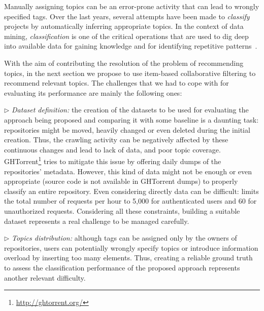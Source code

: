 Manually assigning topics can be an error-prone activity that can lead to 
wrongly specified tags. Over the last years, several attempts have been 
made to \textit{classify} \GH projects by automatically inferring 
appropriate topics. In the context of data mining, \textit{classification} is 
one of the critical operations that are used to dig deep into available data 
for gaining knowledge and for identifying repetitive 
patterns~\cite{kotsiantis2007supervised}. 



\smallskip

With the aim of contributing the resolution of the problem of recommending \GH 
topics, in the next section we propose to use item-based collaborative filtering to recommend relevant topics. The  
challenges that we had to cope with for evaluating its performance are mainly 
the following ones:

\vspace{.2cm}
\noindent
$\triangleright$ \emph{Dataset definition:} the creation of the datasets to be 
used for evaluating the approach being proposed and comparing it with some 
baseline is a daunting task: repositories might be moved, heavily changed or 
even deleted during the initial creation. Thus, the crawling activity can be 
negatively affected by these continuous changes and lead to lack of data, and 
poor topic coverage. GHTorrent\footnote{\url{http://ghtorrent.org/}} tries to 
mitigate this issue by offering daily dumps of the repositories' metadata. 
However, this kind of data might not be enough or even appropriate (\eg source 
code is not available in GHTorrent dumps) to properly classify  an entire 
repository.	Even considering directly \GH data can be difficult: \GH limits the 
total number of requests per hour to 5,000 for authenticated users and 60 for 
unauthorized requests. Considering all these constraints, building a suitable 
dataset represents a real challenge to be managed carefully.
	
\vspace{.2cm}
\noindent
$\triangleright$ \emph{Topics distribution:} although tags can be assigned only 
by the owners of \GH repositories, users can potentially wrongly specify topics 
or introduce information overload by inserting too many elements. Thus, 
creating a reliable ground truth to assess the classification performance of 
the proposed approach represents another relevant difficulty. 